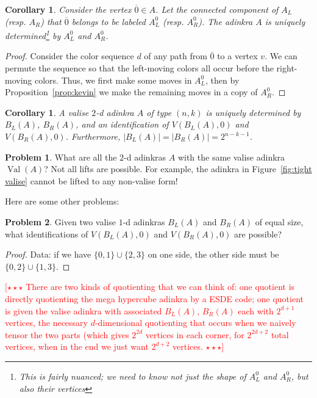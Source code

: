 \documentclass[12pt,twoside,singlespace]{article}
\numberwithin{equation}{section}
\newtheorem{cor}[equation]{Corollary}
\theoremstyle{definition}
\newtheorem{prob}{Problem}
\newcommand{\on}{\operatorname}
\newcommand{\val}{\on{Val}}
\newcommand{\com}[1]{\textcolor{red}{$[\star \star \star$ #1 $\star \star \star]$}}
\begin{document}
\begin{cor}
\label{cor:factorization-connected-components}
Consider the vertex $\overline{0} \in A$. Let the connected component of $A_L$ (resp. $A_R$) that $\overline{0}$ belongs to be labeled $A_L^0$ (resp. $A_R^0$). The adinkra $A$ is uniquely determined\footnote{This is fairly nuanced; we need to know not just the shape of $A_L^0$ and $A_R^0$, but also their vertices} by $A_L^0$ and $A_R^0$.
\end{cor}
\begin{proof}
Consider the color sequence $d$ of any path from $\overline{0}$ to a vertex $v$. We can permute the sequence so that the left-moving colors all occur before the right-moving colors. Thus, we first make some moves in $A_L^0$, then by Proposition~\ref{prop:kevin} we make the remaining moves in a copy of $A_R^0$. 
\end{proof}


\begin{cor}
\label{cor:valise factorization}
A valise $2$-d adinkra $A$ of type $(n,k)$ is uniquely determined by $B_L(A)$, $B_R(A)$, and an identification of $V(B_L(A), 0)$ and $V(B_R(A), 0)$. Furthermore, $|B_L(A)| = |B_R(A)| = 2^{n-k-1}$.
\end{cor}


\begin{prob}
What are all the $2$-d adinkras $A$ with the same valise adinkra $\val(A)$? Not all lifts are possible. For example, the adinkra in Figure~\ref{fig:tight valise} cannot be lifted to any non-valise form!
\end{prob}





Here are some other problems:
\begin{prob}
Given two valise $1$-d adinkras $B_L(A)$ and $B_R(A)$ of equal size, what identifications of $V(B_L(A), 0)$ and $V(B_R(A), 0)$ are possible?
\end{prob}
\begin{proof}
Data: if we have $\{0,1\} \cup \{2,3\}$ on one side, the other side must be $\{0,2\} \cup \{1, 3\}$.
\end{proof}

\com{There are two kinds of quotienting that we can think of: one quotient is directly quotienting the mega hypercube adinkra by a ESDE code; one quotient is given the valise adinkra with associated $B_L(A)$, $B_R(A)$ each with $2^{d+1}$ vertices, the necessary $d$-dimensional quotienting that occurs when we naively tensor the two parts (which gives $2^{2d}$ vertices in each corner, for $2^{2d+2}$ total vertices, when in the end we just want $2^{d+2}$ vertices.}
\end{document}
